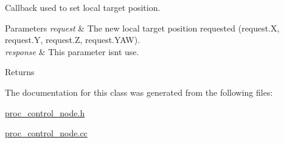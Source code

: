 Callback used to set local target position. 
\begin{DoxyParams}{Parameters}
{\em request} & The new local target position requested (request.\+X, request.\+Y, request.\+Z, request.\+Y\+AW). \\
\hline
{\em response} & This parameter isn\textquotesingle{}t use. \\
\hline
\end{DoxyParams}
\begin{DoxyReturn}{Returns}

\end{DoxyReturn}


The documentation for this class was generated from the following files\+:\begin{DoxyCompactItemize}
\item 
\hyperlink{proc__control__node_8h}{proc\+\_\+control\+\_\+node.\+h}\item 
\hyperlink{proc__control__node_8cc}{proc\+\_\+control\+\_\+node.\+cc}\end{DoxyCompactItemize}
